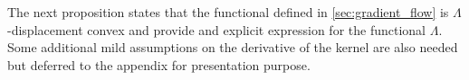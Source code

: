 The next proposition states that the functional defined in \cref{sec:gradient_flow} is $\Lambda$-displacement convex and provide and explicit expression for the functional $\Lambda$. Some additional mild assumptions on the derivative of the kernel are also needed but deferred to the appendix for presentation purpose.

